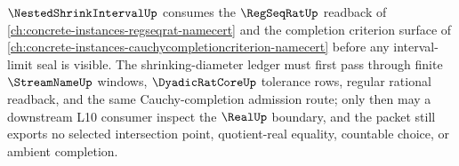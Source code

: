 $\NestedShrinkIntervalUp$ consumes the $\RegSeqRatUp$ readback of \autoref{ch:concrete-instances-regseqrat-namecert} and the completion criterion surface of \autoref{ch:concrete-instances-cauchycompletioncriterion-namecert} before any interval-limit seal is visible. The shrinking-diameter ledger must first pass through finite $\StreamNameUp$ windows, $\DyadicRatCoreUp$ tolerance rows, regular rational readback, and the same Cauchy-completion admission route; only then may a downstream L10 consumer inspect the $\RealUp$ boundary, and the packet still exports no selected intersection point, quotient-real equality, countable choice, or ambient completion.
